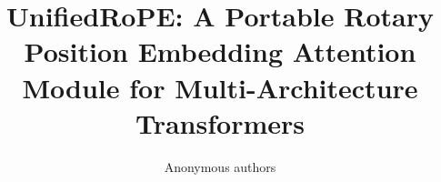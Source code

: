 \title{\textbf{UnifiedRoPE: A Portable Rotary Position Embedding Attention Module for Multi-Architecture Transformers}}

\author{Anonymous authors}
